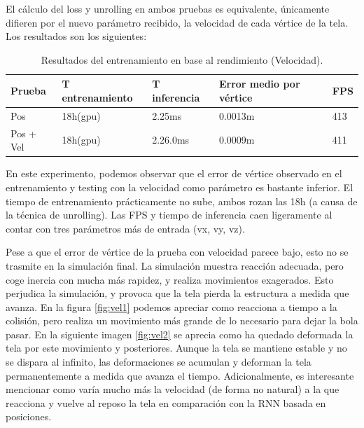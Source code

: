 El cálculo del loss y unrolling en ambos pruebas es equivalente, únicamente difieren por el nuevo parámetro recibido, la velocidad de cada vértice de la tela. 
Los resultados son los siguientes:
\begin{table}[H]
    \begin{center}
        \begin{tabular}{ | m{2.2cm} |  m{2.8cm} | m{2.8cm} | m{2.6cm} | m{1.2cm} |}
        \hline \textbf{Prueba} & \textbf{T entrenamiento} & \textbf{T inferencia} & \textbf{Error medio por vértice} & \textbf{FPS} \\ \hline
            Pos & 18h(gpu) & 2.25ms & 0.0013m & 413 \\ \hline
            Pos + Vel & 18h(gpu) & 2.26.0ms & 0.0009m & 411 \\ \hline
        \end{tabular}
    \end{center}
    \caption{Resultados del entrenamiento en base al rendimiento (Velocidad).}
    \label{tab:rendResultsVel}
\end{table}

En este experimento, podemos observar que el error de vértice observado en el entrenamiento y testing con la velocidad como parámetro es bastante inferior. El tiempo de entrenamiento prácticamente no sube, ambos rozan las 18h (a causa de la técnica de unrolling). Las FPS y tiempo de inferencia caen ligeramente al contar con tres parámetros más de entrada (vx, vy, vz).

Pese a que el error de vértice de la prueba con velocidad parece bajo, esto no se trasmite en la simulación final. La simulación muestra reacción adecuada, pero coge inercia con mucha más rapidez, y realiza movimientos exagerados. Esto perjudica la simulación, y provoca que la tela pierda la estructura a medida que avanza. En la figura \ref{fig:vel1} podemos apreciar como reacciona a tiempo a la colisión, pero realiza un movimiento más grande de lo necesario para dejar la bola pasar. En la siguiente imagen \ref{fig:vel2} se aprecia como ha quedado deformada la tela por este movimiento y posteriores. Aunque la tela se mantiene estable y no se dispara al infinito, las deformaciones se acumulan y deforman la tela permanentemente a medida que avanza el tiempo. Adicionalmente, es interesante mencionar como varía mucho más la velocidad (de forma no natural) a la que reacciona y vuelve al reposo la tela en comparación con la RNN basada en posiciones.

